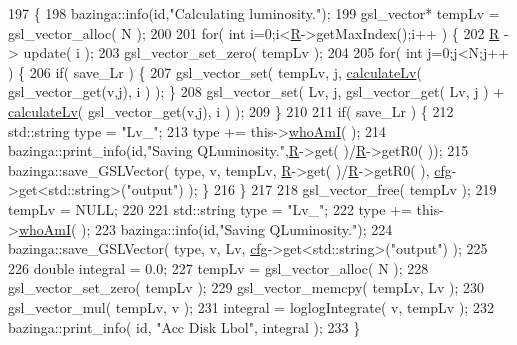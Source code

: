 \begin{DoxyCode}
197                                          \{
198   bazinga::info(\textcolor{keywordtype}{id},\textcolor{stringliteral}{"Calculating luminosity."});
199   gsl\_vector* tempLv = gsl\_vector\_alloc( N );
200 
201   \textcolor{keywordflow}{for}( \textcolor{keywordtype}{int} i=0;i<\hyperlink{classQuasarAccDisk_a470359d2a40c176d5eef36a7bf2fc5bf}{R}->getMaxIndex();i++ ) \{
202     \hyperlink{classQuasarAccDisk_a470359d2a40c176d5eef36a7bf2fc5bf}{R} -> update( i );
203     gsl\_vector\_set\_zero( tempLv );
204 
205     \textcolor{keywordflow}{for}( \textcolor{keywordtype}{int} j=0;j<N;j++ ) \{
206       \textcolor{keywordflow}{if}( save\_Lr ) \{
207     gsl\_vector\_set( tempLv, j, \hyperlink{classQuasarAccDisk_a8a29f029fd2e38784bce7dbe8f9533d2}{calculateLv}( gsl\_vector\_get(v,j), i ) ); \}
208       gsl\_vector\_set( Lv, j, gsl\_vector\_get( Lv, j ) + \hyperlink{classQuasarAccDisk_a8a29f029fd2e38784bce7dbe8f9533d2}{calculateLv}( gsl\_vector\_get(v,j), i ) );
209     \}
210 
211     \textcolor{keywordflow}{if}( save\_Lr ) \{
212       std::string type = \textcolor{stringliteral}{"Lv\_"};
213       type += this->\hyperlink{classbaseClass_a756d5accf10ced9a34024048c95a51c9}{whoAmI}( );
214       bazinga::print\_info(\textcolor{keywordtype}{id},\textcolor{stringliteral}{"Saving QLuminosity."},\hyperlink{classQuasarAccDisk_a470359d2a40c176d5eef36a7bf2fc5bf}{R}->get( )/\hyperlink{classQuasarAccDisk_a470359d2a40c176d5eef36a7bf2fc5bf}{R}->getR0( ));
215       bazinga::save\_GSLVector( type, v, tempLv, \hyperlink{classQuasarAccDisk_a470359d2a40c176d5eef36a7bf2fc5bf}{R}->get( )/\hyperlink{classQuasarAccDisk_a470359d2a40c176d5eef36a7bf2fc5bf}{R}->getR0( ), \hyperlink{classbaseClass_a744f87a6ebe63da08256c022d42a4ca7}{cfg}->get<std::string>(\textcolor{stringliteral}{"output"})
       ); \}
216   \}
217 
218   gsl\_vector\_free( tempLv );
219   tempLv = NULL;
220 
221   std::string type = \textcolor{stringliteral}{"Lv\_"};
222   type += this->\hyperlink{classbaseClass_a756d5accf10ced9a34024048c95a51c9}{whoAmI}( );
223   bazinga::info(\textcolor{keywordtype}{id},\textcolor{stringliteral}{"Saving QLuminosity."});
224   bazinga::save\_GSLVector( type, v, Lv, \hyperlink{classbaseClass_a744f87a6ebe63da08256c022d42a4ca7}{cfg}->get<std::string>(\textcolor{stringliteral}{"output"}) );
225 
226   \textcolor{keywordtype}{double} integral = 0.0;
227   tempLv = gsl\_vector\_alloc( N );
228   gsl\_vector\_set\_zero( tempLv );
229   gsl\_vector\_memcpy( tempLv, Lv );
230   gsl\_vector\_mul( tempLv, v );
231   integral = loglogIntegrate( v, tempLv );
232   bazinga::print\_info( \textcolor{keywordtype}{id}, \textcolor{stringliteral}{"Acc Disk Lbol"}, integral );    
233 \}
\end{DoxyCode}
